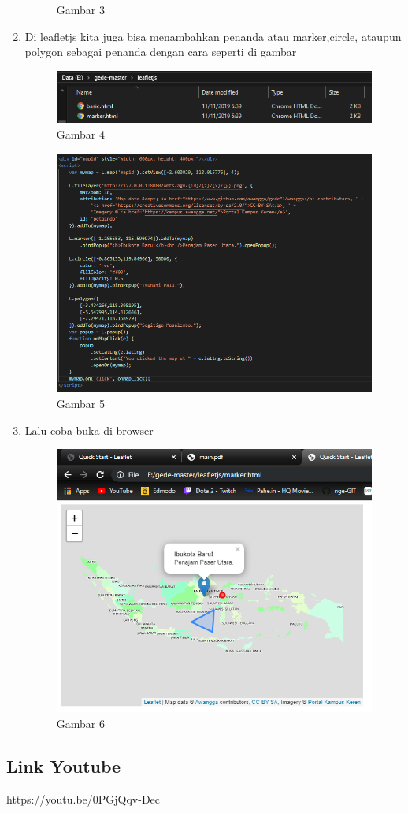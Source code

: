 \begin{enumerate}
\begin{figure}[H]
		\centering
		\caption{Gambar 3}
	\end{figure}
    \item Di leafletjs kita juga bisa menambahkan penanda atau marker,circle, ataupun polygon sebagai penanda dengan cara seperti di gambar
    \hfill\break
    \begin{figure}[H]
		\includegraphics[width=12cm]{figures/Tugas5/1174079/2.png}
		\centering
		\caption{Gambar 4}
	\end{figure}
	\begin{figure}[H]
		\includegraphics[width=12cm]{figures/Tugas5/1174079/4.png}
		\centering
		\caption{Gambar 5}
	\end{figure}
    \item Lalu coba buka di browser
    \hfill\break
    \begin{figure}[H]
		\includegraphics[width=12cm]{figures/Tugas5/1174079/5.png}
		\centering
		\caption{Gambar 6}
	\end{figure}
\end{enumerate}
\subsection{Link Youtube}
https://youtu.be/0PGjQqv-Dec